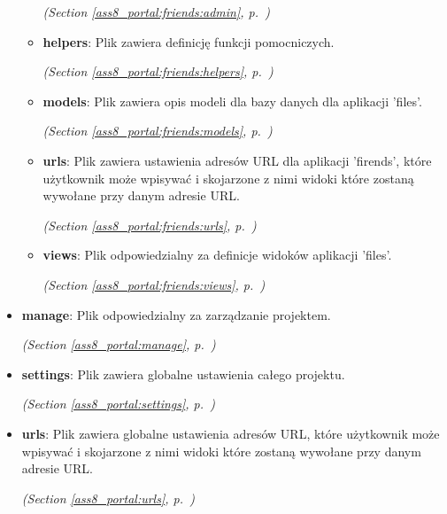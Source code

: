 \begin{itemize}
\begin{itemize}
  \textit{(Section \ref{ass8_portal:friends:admin}, p.~\pageref{ass8_portal:friends:admin})}

    \item \textbf{helpers}: Plik zawiera definicję funkcji pomocniczych.



  \textit{(Section \ref{ass8_portal:friends:helpers}, p.~\pageref{ass8_portal:friends:helpers})}

    \item \textbf{models}: Plik zawiera opis modeli dla bazy danych dla aplikacji 'files'.



  \textit{(Section \ref{ass8_portal:friends:models}, p.~\pageref{ass8_portal:friends:models})}

    \item \textbf{urls}: 
Plik zawiera ustawienia adresów URL dla aplikacji 'firends', 
które użytkownik może wpisywać i skojarzone z nimi widoki które zostaną wywołane przy 
danym adresie URL. 


  \textit{(Section \ref{ass8_portal:friends:urls}, p.~\pageref{ass8_portal:friends:urls})}

    \item \textbf{views}: Plik odpowiedzialny za definicje widoków aplikacji 'files'.



  \textit{(Section \ref{ass8_portal:friends:views}, p.~\pageref{ass8_portal:friends:views})}

  \end{itemize}
\item \textbf{manage}: Plik odpowiedzialny za zarządzanie projektem.



  \textit{(Section \ref{ass8_portal:manage}, p.~\pageref{ass8_portal:manage})}

\item \textbf{settings}: Plik zawiera globalne ustawienia całego projektu.



  \textit{(Section \ref{ass8_portal:settings}, p.~\pageref{ass8_portal:settings})}

\item \textbf{urls}: 
Plik zawiera globalne ustawienia adresów URL, które użytkownik może wpisywać i skojarzone z nimi
widoki które zostaną wywołane przy danym adresie URL. 


  \textit{(Section \ref{ass8_portal:urls}, p.~\pageref{ass8_portal:urls})}

\end{itemize}


